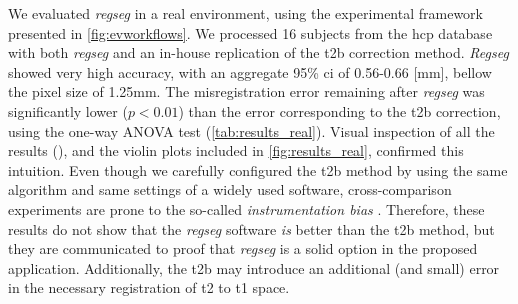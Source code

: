 We evaluated \emph{regseg} in a real environment, using the experimental framework presented
  in \autoref{fig:evworkflows}.
We processed 16 subjects from the \gls*{hcp} database with both \emph{regseg}
  and an in-house replication of the \gls*{t2b} correction method.
\emph{Regseg} showed very high accuracy, with an aggregate 95\% \gls*{ci} of 0.56-0.66 [mm],
  bellow the pixel size of 1.25mm.
The misregistration error remaining after \emph{regseg} was significantly lower ($p < 0.01$) than the
  error corresponding to the \gls*{t2b} correction, using the one-way ANOVA test
  (\autoref{tab:results_real}).
Visual inspection of all the results (), and the violin plots included in
  \autoref{fig:results_real}, confirmed this intuition.
Even though we carefully configured the \gls*{t2b} method by using the same algorithm and
  same settings of a widely used software, cross-comparison experiments are prone to
  the so-called \emph{instrumentation bias} \citep{tustison_instrumentation_2013}.
Therefore, these results do not show that the \emph{regseg} software \emph{is} better than the
  \gls*{t2b} method, but they are communicated to proof that \emph{regseg} is a solid option
  in the proposed application.
Additionally, the \gls*{t2b} may introduce an additional (and small) error in the necessary
  registration of \gls*{t2} to \gls*{t1} space.

